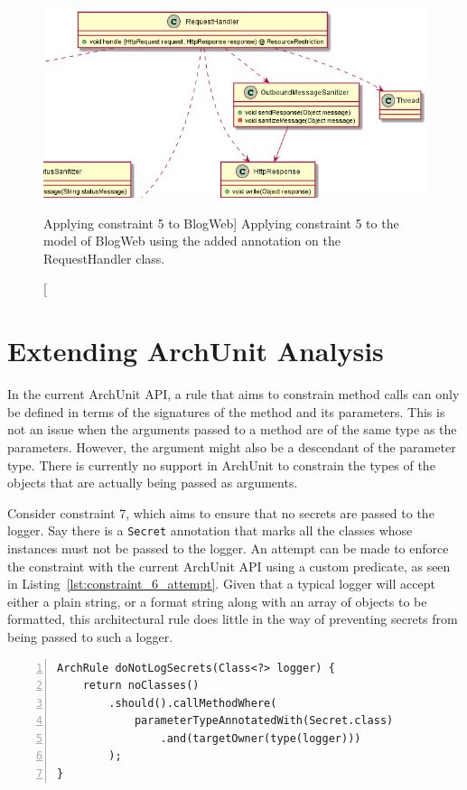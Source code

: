 \begin{figure}
    \centering
    \includegraphics[width=\linewidth]{figure/toyexamples/resource_restriction.png}
    \caption
        [Applying constraint 5 to BlogWeb]
        {Applying constraint 5 to the model of BlogWeb using the added annotation on the RequestHandler class.}
    \label{fig:toy_resource_restriction}
\end{figure}




\section{Extending ArchUnit Analysis}

In the current ArchUnit API, a rule that aims to constrain method calls can only be defined in terms of the signatures of the method and its parameters. This is not an issue when the arguments passed to a method are of the same type as the parameters. However, the argument might also be a descendant of the parameter type. There is currently no support in ArchUnit to constrain the types of the objects that are actually being passed as arguments.

Consider constraint 7, which aims to ensure that no secrets are passed to the logger. Say there is a \texttt{Secret} annotation that marks all the classes whose instances must not be passed to the logger. An attempt can be made to enforce the constraint with the current ArchUnit API using a custom predicate, as seen in Listing~\ref{lst:constraint_6_attempt}. Given that a typical logger will accept either a plain string, or a format string along with an array of objects to be formatted, this architectural rule does little in the way of preventing secrets from being passed to such a logger.

\begin{minipage}{\linewidth}
\begin{lstlisting}[caption={A first attempt to implement constraint 7.}, captionpos=b, label=lst:constraint_6_attempt, numbers=left]
ArchRule doNotLogSecrets(Class<?> logger) {
    return noClasses()
        .should().callMethodWhere(
            parameterTypeAnnotatedWith(Secret.class)
                .and(targetOwner(type(logger)))
        );
}
\end{lstlisting}
\end{minipage}

